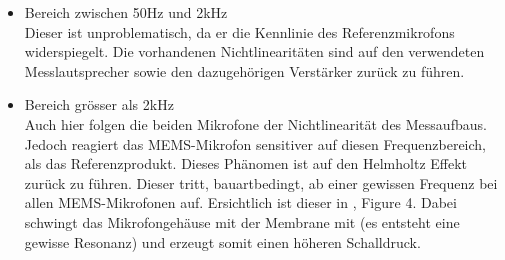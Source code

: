 \documentclass[12pt]{article}
\begin{document}
		\begin{itemize}
			\item Bereich zwischen 50Hz und 2kHz \\
			Dieser ist unproblematisch, da er die Kennlinie des Referenzmikrofons widerspiegelt. Die vorhandenen Nichtlinearitäten sind auf den verwendeten Messlautsprecher sowie den dazugehörigen Verstärker zurück zu führen.
			\item \color{orange} Bereich grösser als 2kHz \color{black} \\
			Auch hier folgen die beiden Mikrofone der Nichtlinearität des Messaufbaus. Jedoch reagiert das \color{blue}MEMS\color{black}-Mikrofon sensitiver auf diesen Frequenzbereich, als das Referenzprodukt. Dieses Phänomen ist auf den Helmholtz Effekt zurück zu führen. 				Dieser tritt, bauartbedingt, ab einer gewissen Frequenz bei allen MEMS-Mikrofonen auf. Ersichtlich ist dieser in \cite{noauthor_httpsinvensensetdkcomwp-contentuploads202007ds-000157-ics-41351-v14pdf_nodate}, Figure 4. Dabei schwingt das Mikrofongehäuse mit der Membrane mit (es entsteht eine gewisse Resonanz) und erzeugt somit einen höheren Schalldruck.
		\end{itemize}
		
\end{document}
